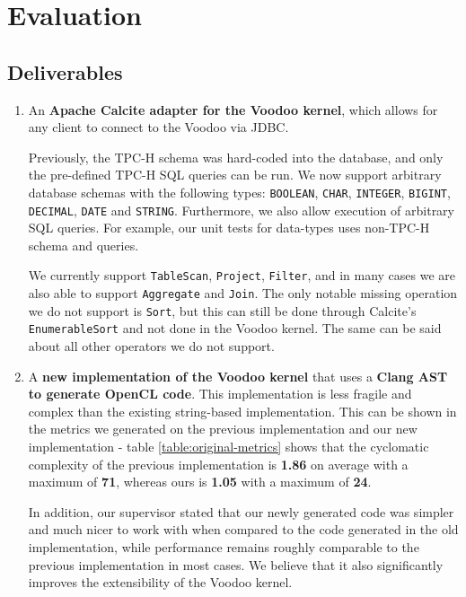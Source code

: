 \chapter{Evaluation}

\section{Deliverables}

\begin{enumerate}
    \item An \textbf{Apache Calcite adapter for the Voodoo kernel}, which allows for any client to connect to the Voodoo via JDBC.
    
    Previously, the TPC-H schema was hard-coded into the database, and only the pre-defined TPC-H SQL queries can be run. We now support arbitrary database schemas with the following types: \texttt{BOOLEAN}, \texttt{CHAR}, \texttt{INTEGER}, \texttt{BIGINT}, \texttt{DECIMAL}, \texttt{DATE} and \texttt{STRING}. Furthermore, we also allow execution of arbitrary SQL queries. For example, our unit tests for data-types uses non-TPC-H schema and queries.
    
    We currently support \texttt{TableScan}, \texttt{Project}, \texttt{Filter}, and in many cases we are also able to support \texttt{Aggregate} and \texttt{Join}. The only notable missing operation we do not support is \texttt{Sort}, but this can still be done through Calcite's \texttt{EnumerableSort} and not done in the Voodoo kernel. The same can be said about all other operators we do not support.
    
    \item A \textbf{new implementation of the Voodoo kernel} that uses a \textbf{Clang AST to generate OpenCL code}. This implementation is less fragile and complex than the existing string-based implementation. This can be shown in the metrics we generated on the previous implementation and our new implementation - table \ref{table:original-metrics} shows that the cyclomatic complexity of the previous implementation is \textbf{1.86} on average with a maximum of \textbf{71}, whereas ours is \textbf{1.05} with a maximum of \textbf{24}.
    
    In addition, our supervisor stated that our newly generated code was simpler and much nicer to work with when compared to the code generated in the old implementation, while performance remains roughly comparable to the previous implementation in most cases. We believe that it also significantly improves the extensibility of the Voodoo kernel.
    

\end{enumerate}

